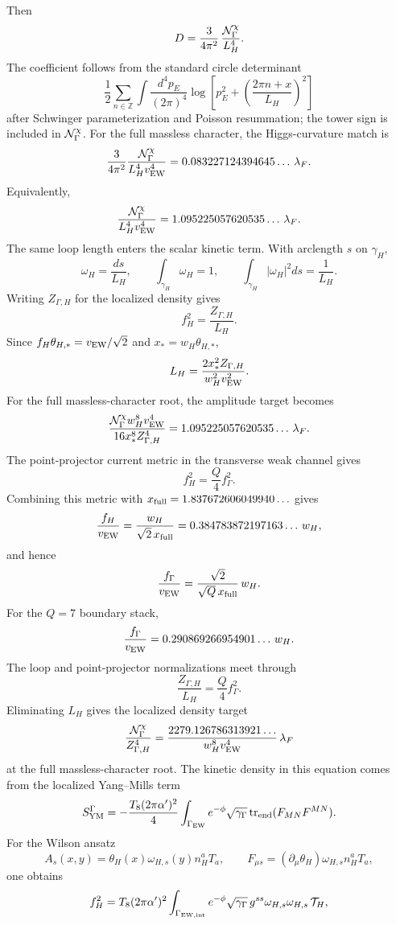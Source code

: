 \documentclass[11pt]{article}
\theoremstyle{definition}
\theoremstyle{remark}
\begin{document}
Then
\[
  D=
  \frac{3}{4\pi^2}\,
  \frac{{\cal N}_\Gamma^\chi}{L_H^4}.
\]
The coefficient follows from the standard circle determinant
\[
  \frac12\sum_{n\in\mathbb Z}
  \int\frac{d^4p_E}{(2\pi)^4}
  \log\!\left[
    p_E^2+\left(\frac{2\pi n+x}{L_H}\right)^2
  \right]
\]
after Schwinger parameterization and Poisson resummation; the tower sign is
included in \({\cal N}_\Gamma^\chi\).
For the full massless character, the Higgs-curvature match is
\[
  \frac{3}{4\pi^2}
  \frac{{\cal N}_\Gamma^\chi}{L_H^4v_{\rm EW}^4}
  =
  0.083227124394645\ldots\,\lambda_F .
\]
Equivalently,
\[
  \frac{{\cal N}_\Gamma^\chi}{L_H^4v_{\rm EW}^4}
  =
  1.095225057620535\ldots\,\lambda_F .
\]
The same loop length enters the scalar kinetic term.  With arclength \(s\) on
\(\gamma_H\),
\[
  \omega_H=\frac{ds}{L_H},\qquad
  \int_{\gamma_H}\omega_H=1,\qquad
  \int_{\gamma_H}|\omega_H|^2ds=\frac1{L_H}.
\]
Writing \(Z_{\Gamma,H}\) for the localized density gives
\[
  f_H^2=\frac{Z_{\Gamma,H}}{L_H}.
\]
Since \(f_H\theta_{H,*}=v_{\rm EW}/\sqrt2\) and
\(x_*=w_H\theta_{H,*}\),
\[
  L_H=
  \frac{2x_*^2Z_{\Gamma,H}}{w_H^2v_{\rm EW}^2}.
\]
For the full massless-character root, the amplitude target becomes
\[
  \frac{{\cal N}_\Gamma^\chi w_H^8 v_{\rm EW}^4}
       {16x_*^8 Z_{\Gamma,H}^4}
  =
  1.095225057620535\ldots\,\lambda_F .
\]
The point-projector current metric in the transverse weak channel gives
\[
  f_H^2=\frac{Q}{4}f_\Gamma^2 .
\]
Combining this metric with \(x_{\rm full}=1.837672606049940\ldots\) gives
\[
  \frac{f_H}{v_{\rm EW}}
  =
  \frac{w_H}{\sqrt2\,x_{\rm full}}
  =
  0.384783872197163\ldots\,w_H,
\]
and hence
\[
  \frac{f_\Gamma}{v_{\rm EW}}
  =
  \frac{\sqrt2}{\sqrt Q\,x_{\rm full}}\,w_H .
\]
For the \(Q=7\) boundary stack,
\[
  \frac{f_\Gamma}{v_{\rm EW}}
  =
  0.290869266954901\ldots\,w_H .
\]
The loop and point-projector normalizations meet through
\[
  \frac{Z_{\Gamma,H}}{L_H}=\frac{Q}{4}f_\Gamma^2 .
\]
Eliminating \(L_H\) gives the localized density target
\[
  \frac{{\cal N}_\Gamma^\chi}{Z_{\Gamma,H}^4}
  =
  \frac{2279.126786313921\ldots}{w_H^8v_{\rm EW}^4}\,
  \lambda_F
\]
at the full massless-character root.
The kinetic density in this equation comes from the localized Yang--Mills
term
\[
  S_{\rm YM}^{\Gamma}
  =
  -\frac{T_8(2\pi\alpha')^2}{4}
  \int_{\Gamma_{\rm EW}}
  e^{-\phi}\sqrt{\gamma_\Gamma}\,
  {\rm tr}_{\rm end}(F_{MN}F^{MN}) .
\]
For the Wilson ansatz
\[
  A_s(x,y)=\theta_H(x)\omega_{H,s}(y)n_H^aT_a ,
  \qquad
  F_{\mu s}=(\partial_\mu\theta_H)\omega_{H,s}n_H^aT_a ,
\]
one obtains
\[
  f_H^2
  =
  T_8(2\pi\alpha')^2
  \int_{\Gamma_{\rm EW,int}}
  e^{-\phi}\sqrt{\gamma_\Gamma}\,
  g^{ss}\omega_{H,s}\omega_{H,s}\,
  {\cal T}_H ,
\]
\end{document}
